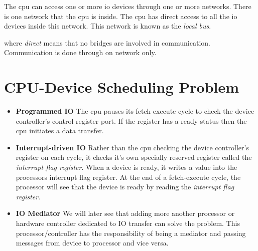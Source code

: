 The cpu can access one or more io devices through one or more networks.
There is one network that the cpu is inside. The cpu has direct access to all the io devices 
inside this network. This network is known as the \textit{local bus}. 

where \textit{direct} means that no bridges are involved in communication. 
Communication is done through on network only. 

\section{CPU-Device Scheduling Problem}

\begin{figure}[h]
\end{figure}


\begin{itemize}   
\renewcommand{\labelitemi}{$\Box$}
\item \textbf{Programmed IO} 
The cpu pauses its fetch execute cycle to check the device controller’s control register port. 
If the register has a ready status then the cpu initiates a data transfer. 
\item \textbf{Interrupt-driven IO} 
Rather than the cpu checking the device controller's register on each cycle, it 
checks it's own specially reserved register called the \textit{interrupt flag register}. 
When a device is ready, it writes a value into the processors interrupt flag register.
At the end of a fetch-execute cycle, the processor will see that the device is ready 
by reading the \textit{interrupt flag register}. 
\item \textbf{IO Mediator} 
We will later see that adding more another processor or hardware controller dedicated 
to IO transfer can solve the problem. This processor/controller has the responsibility 
of being a mediator and passing messages from device to processor and vice versa. 
\end{itemize}

